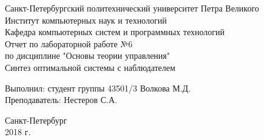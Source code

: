 	\begin{titlepage}
		\begin{center}
			Санкт-Петербургский политехнический университет Петра Великого\\
			Институт компьютерных наук и технологий\\
			Кафедра компьютерных систем и программных технологий\\
			\vspace{6cm}
			Отчет по лабораторной работе №6\\
			\vspace{0.2cm}	
			по дисциплине "Основы теории управления"\\
			\vspace{0.5cm}	
			\Large
			Синтез оптимальной системы с наблюдателем
			\small
		\end{center}
		\vspace{5cm}
		\begin{flushright}
			Выполнил: студент группы 43501/3	Волкова М.Д.\\
			\vspace{0.5cm}			
			Преподаватель: Нестеров С.А.\\
		\end{flushright}
		\vspace{7cm}
		\begin{center}
			Санкт-Петербург\\
			2018 г.\\
		\end{center}
	\end{titlepage}
	\newpage
